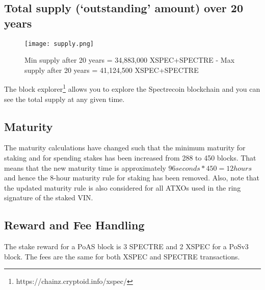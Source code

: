 \subsection{Total supply (‘outstanding’ amount) over 20 years}
\begin{figure}[ht]
	\centering
	\texttt{[image: supply.png]}
	\caption{Min supply after 20 years = 34,883,000 XSPEC+SPECTRE - Max 
		supply after 20 years = 41,124,500 XSPEC+SPECTRE}
\end{figure}
\noindent
The block explorer\footnote{https://chainz.cryptoid.info/xspec/} allows you 
to explore the Spectrecoin blockchain and you can see the total supply at any given time.

\subsection{Maturity}
The maturity calculations have changed such that the minimum maturity for
staking and for spending stakes has been increased from 288 to 450 blocks. That means that the new maturity time is approximately $96 seconds * 450 = 12 hours$ and hence the 8-hour maturity rule for staking has been removed. Also, note that the updated maturity rule is also considered for all ATXOs used in the ring signature
of the staked VIN.

\subsection{Reward and Fee Handling}
The stake reward for a PoAS block is 3 SPECTRE and 2 XSPEC for a PoSv3 block.
The fees are the same for both XSPEC and SPECTRE transactions.
\newpage

